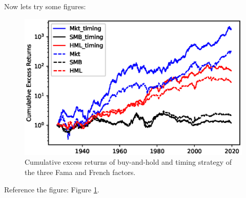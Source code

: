\documentclass[a4paper,12pt]{article}
\begin{document}
	Now lets try some figures:
		\begin{figure}[H]
			\centering
			\includegraphics[width=\textwidth]{img/Replication.eps}
			\caption{Cumulative excess returns of buy-and-hold and timing strategy of the three Fama and French factors.}
            \label{fig:replication}
	\end{figure}
	Reference the figure: Figure \ref{fig:replication}. \cite{Busse}
	


	\clearpage\thispagestyle{empty}\addtocounter{page}{-1}\mbox{}
	
	
	
	
	
\end{document}
